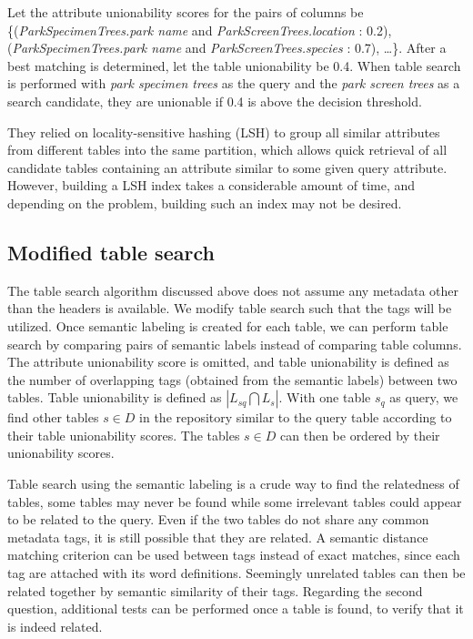 Let the attribute unionability scores for the pairs of columns be \{(\textit{ParkSpecimenTrees.park name} and \textit{ParkScreenTrees.location} : 0.2), (\textit{ParkSpecimenTrees.park name} and \textit{ParkScreenTrees.species} : 0.7), \dots\}. After a best matching is determined, let the table unionability be 0.4. When table search is performed with \textit{park specimen trees} as the query and the \textit{park screen trees} as a search candidate, they are unionable if 0.4 is above the decision threshold.

They relied on locality-sensitive hashing (LSH) to group all similar attributes from different tables into the same partition, which allows quick retrieval of all candidate tables containing an attribute similar to some given query attribute. However, building a LSH index takes a considerable amount of time, and depending on the problem, building such an index may not be desired.

\subsection{Modified table search}
\label{ssec:ModifiedTableSearch}

The table search algorithm discussed above does not assume any metadata other than the headers is available. We modify table search such that the tags will be utilized. Once semantic labeling is created for each table, we can perform table search by comparing pairs of semantic labels instead of comparing table columns. The attribute unionability score is omitted, and table unionability is defined as the number of overlapping tags (obtained from the semantic labels) between two tables. Table unionability is defined as $|L_{sq}\bigcap L_{s}|$. With one table $s_{q}$ as query, we find other tables $s\in D$ in the repository similar to the query table according to their table unionability scores. The tables $s\in D$ can then be ordered by their unionability scores.

Table search using the semantic labeling is a crude way to find the relatedness of tables, some tables may never be found while some irrelevant tables could appear to be related to the query. Even if the two tables do not share any common metadata tags, it is still possible that they are related. A semantic distance matching criterion can be used between tags instead of exact matches, since each tag are attached with its word definitions. Seemingly unrelated tables can then be related together by semantic similarity of their tags. Regarding the second question, additional tests can be performed once a table is found, to verify that it is indeed related.

